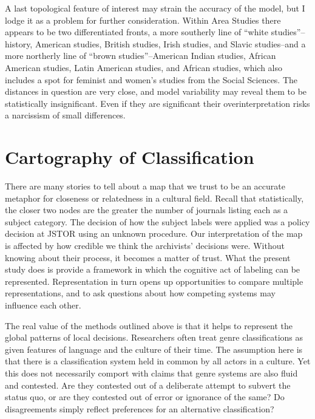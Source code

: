 \documentclass[]{book}
\theoremstyle{definition}
\theoremstyle{definition}
\theoremstyle{definition}
\theoremstyle{remark}
\begin{document}
A last topological feature of interest may strain the accuracy of the
model, but I lodge it as a problem for further consideration. Within
Area Studies there appears to be two differentiated fronts, a more
southerly line of ``white studies''--history, American studies, British
studies, Irish studies, and Slavic studies--and a more northerly line of
``brown studies''--American Indian studies, African American studies,
Latin American studies, and African studies, which also includes a spot
for feminist and women's studies from the Social Sciences. The distances
in question are very close, and model variability may reveal them to be
statistically insignificant. Even if they are significant their
overinterpretation risks a narcissism of small differences.

\hypertarget{cartography-of-classification}{%
\section{Cartography of
Classification}\label{cartography-of-classification}}

There are many stories to tell about a map that we trust to be an
accurate metaphor for closeness or relatedness in a cultural field.
Recall that statistically, the closer two nodes are the greater the
number of journals listing each as a subject category. The decision of
how the subject labels were applied was a policy decision at JSTOR using
an unknown procedure. Our interpretation of the map is affected by how
credible we think the archivists' decisions were. Without knowing about
their process, it becomes a matter of trust. What the present study does
is provide a framework in which the cognitive act of labeling can be
represented. Representation in turn opens up opportunities to compare
multiple representations, and to ask questions about how competing
systems may influence each other.

The real value of the methods outlined above is that it helps to
represent the global patterns of local decisions. Researchers often
treat genre classifications as given features of language and the
culture of their time. The assumption here is that there is a
classification system held in common by all actors in a culture. Yet
this does not necessarily comport with claims that genre systems are
also fluid and contested. Are they contested out of a deliberate attempt
to subvert the status quo, or are they contested out of error or
ignorance of the same? Do disagreements simply reflect preferences for
an alternative classification?
\end{document}
